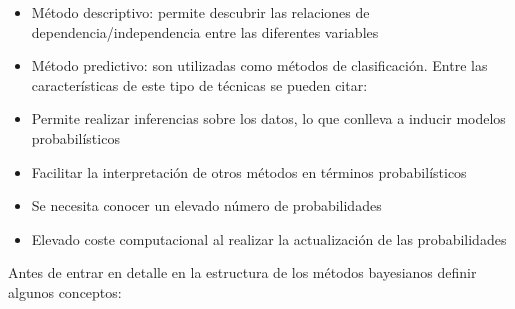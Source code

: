 \documentclass[
  a4paper,
  DIV=11,
  numbers=noendperiod]{scrreprt}
\providecommand{\tightlist}{%
  \setlength{\itemsep}{0pt}\setlength{\parskip}{0pt}}\usepackage{longtable,booktabs,array}
\begin{document}
\begin{itemize}
\tightlist
\item
  Método descriptivo: permite descubrir las relaciones de
  dependencia/independencia entre las diferentes variables
\item
  Método predictivo: son utilizadas como métodos de clasificación. Entre
  las características de este tipo de técnicas se pueden citar:
\item
  Permite realizar inferencias sobre los datos, lo que conlleva a
  inducir modelos probabilísticos
\item
  Facilitar la interpretación de otros métodos en términos
  probabilísticos
\item
  Se necesita conocer un elevado número de probabilidades
\item
  Elevado coste computacional al realizar la actualización de las
  probabilidades
\end{itemize}

Antes de entrar en detalle en la estructura de los métodos bayesianos
definir algunos conceptos:
\end{document}
